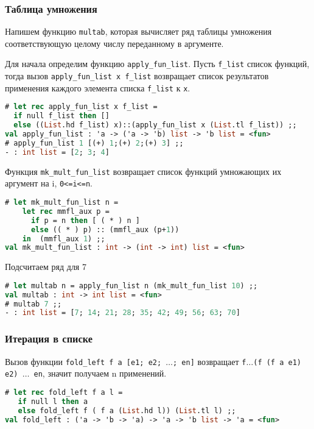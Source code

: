 \subsubsection{Таблица умножения}

Напишем функцию \texttt{multab}, которая вычисляет ряд таблицы умножения
соответствующую целому числу переданному в аргументе.

Для начала определим функцию \texttt{apply\_fun\_list}. Пусть \texttt{f\_list}
список функций, тогда вызов \texttt{apply\_fun\_list x f\_list} возвращает
список результатов применения каждого элемента списка \texttt{f\_list} к
\texttt{x}.

\begin{lstlisting}[language=OCaml]
# let rec apply_fun_list x f_list =
  if null f_list then []
  else ((List.hd f_list) x)::(apply_fun_list x (List.tl f_list)) ;;
val apply_fun_list : 'a -> ('a -> 'b) list -> 'b list = <fun>
# apply_fun_list 1 [(+) 1;(+) 2;(+) 3] ;;
- : int list = [2; 3; 4]
\end{lstlisting}

Функция \texttt{mk\_mult\_fun\_list} возвращает список функций умножающих их
аргумент на i, \texttt{0<=i<=n}.

\begin{lstlisting}[language=OCaml]
# let mk_mult_fun_list n =
    let rec mmfl_aux p =
      if p = n then [ ( * ) n ]
      else (( * ) p) :: (mmfl_aux (p+1))
    in  (mmfl_aux 1) ;;
val mk_mult_fun_list : int -> (int -> int) list = <fun>
\end{lstlisting}

Подсчитаем ряд для 7

\begin{lstlisting}[language=OCaml]
# let multab n = apply_fun_list n (mk_mult_fun_list 10) ;;
val multab : int -> int list = <fun>
# multab 7 ;;
- : int list = [7; 14; 21; 28; 35; 42; 49; 56; 63; 70]
\end{lstlisting}

\subsubsection{Итерация в списке}

Вызов функции \texttt{fold\_left f a [e1; e2; $\ldots$; en]} возвращает
\texttt{f$\ldots$(f (f a e1) e2) $\ldots$ en}, значит получаем n применений.

\begin{lstlisting}[language=OCaml]
# let rec fold_left f a l =
   if null l then a
   else fold_left f ( f a (List.hd l)) (List.tl l) ;;
val fold_left : ('a -> 'b -> 'a) -> 'a -> 'b list -> 'a = <fun>
\end{lstlisting}

